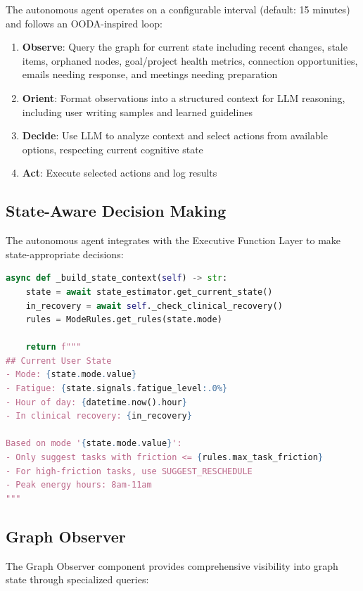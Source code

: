 \documentclass[11pt,a4paper]{article}
\begin{document}
The autonomous agent operates on a configurable interval (default: 15 minutes) and follows an OODA-inspired loop:

\begin{enumerate}
    \item \textbf{Observe}: Query the graph for current state including recent changes, stale items, orphaned nodes, goal/project health metrics, connection opportunities, emails needing response, and meetings needing preparation
    \item \textbf{Orient}: Format observations into a structured context for LLM reasoning, including user writing samples and learned guidelines
    \item \textbf{Decide}: Use LLM to analyze context and select actions from available options, respecting current cognitive state
    \item \textbf{Act}: Execute selected actions and log results
\end{enumerate}

\subsection{State-Aware Decision Making}

The autonomous agent integrates with the Executive Function Layer to make state-appropriate decisions:

\begin{lstlisting}[language=Python]
async def _build_state_context(self) -> str:
    state = await state_estimator.get_current_state()
    in_recovery = await self._check_clinical_recovery()
    rules = ModeRules.get_rules(state.mode)

    return f"""
## Current User State
- Mode: {state.mode.value}
- Fatigue: {state.signals.fatigue_level:.0%}
- Hour of day: {datetime.now().hour}
- In clinical recovery: {in_recovery}

Based on mode '{state.mode.value}':
- Only suggest tasks with friction <= {rules.max_task_friction}
- For high-friction tasks, use SUGGEST_RESCHEDULE
- Peak energy hours: 8am-11am
"""
\end{lstlisting}

\subsection{Graph Observer}

The Graph Observer component provides comprehensive visibility into graph state through specialized queries:
\end{document}
